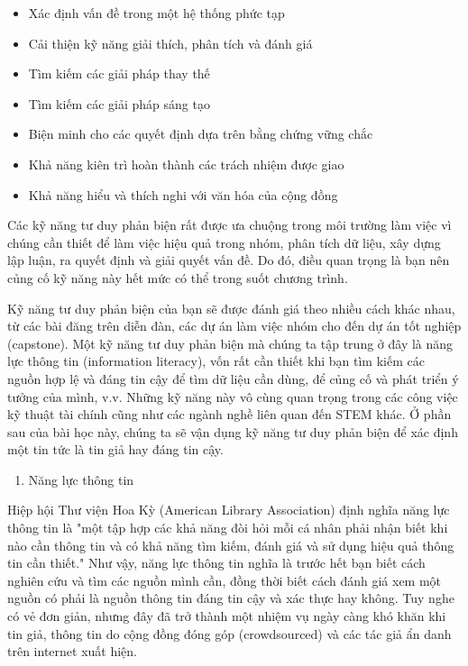 \begin{itemize}
\item
  Xác định vấn đề trong một hệ thống phức tạp
\item
  Cải thiện kỹ năng giải thích, phân tích và đánh giá
\item
  Tìm kiếm các giải pháp thay thế
\item
  Tìm kiếm các giải pháp sáng tạo
\item
  Biện minh cho các quyết định dựa trên bằng chứng vững chắc
\item
  Khả năng kiên trì hoàn thành các trách nhiệm được giao
\item
  Khả năng hiểu và thích nghi với văn hóa của cộng đồng
\end{itemize}

Các kỹ năng tư duy phản biện rất được ưa chuộng trong môi trường làm việc vì chúng cần thiết để làm việc hiệu quả trong nhóm, phân tích dữ liệu, xây dựng lập luận, ra quyết định và giải quyết vấn đề. Do đó, điều quan trọng là bạn nên củng cố kỹ năng này hết mức có thể trong suốt chương trình.

Kỹ năng tư duy phản biện của bạn sẽ được đánh giá theo nhiều cách khác nhau, từ các bài đăng trên diễn đàn, các dự án làm việc nhóm cho đến dự án tốt nghiệp (capstone). Một kỹ năng tư duy phản biện mà chúng ta tập trung ở đây là năng lực thông tin (information literacy), vốn rất cần thiết khi bạn tìm kiếm các nguồn hợp lệ và đáng tin cậy để tìm dữ liệu cần dùng, để củng cố và phát triển ý tưởng của mình, v.v. Những kỹ năng này vô cùng quan trọng trong các công việc kỹ thuật tài chính cũng như các ngành nghề liên quan đến STEM khác. Ở phần sau của bài học này, chúng ta sẽ vận dụng kỹ năng tư duy phản biện để xác định một tin tức là tin giả hay đáng tin cậy.

\begin{enumerate}
\def\labelenumi{\arabic{enumi}.}
\setcounter{enumi}{1}
\item
  Năng lực thông tin
\end{enumerate}

Hiệp hội Thư viện Hoa Kỳ (American Library Association) định nghĩa năng lực thông tin là "một tập hợp các khả năng đòi hỏi mỗi cá nhân phải nhận biết khi nào cần thông tin và có khả năng tìm kiếm, đánh giá và sử dụng hiệu quả thông tin cần thiết." Như vậy, năng lực thông tin nghĩa là trước hết bạn biết cách nghiên cứu và tìm các nguồn mình cần, đồng thời biết cách đánh giá xem một nguồn có phải là nguồn thông tin đáng tin cậy và xác thực hay không. Tuy nghe có vẻ đơn giản, nhưng đây đã trở thành một nhiệm vụ ngày càng khó khăn khi tin giả, thông tin do cộng đồng đóng góp (crowdsourced) và các tác giả ẩn danh trên internet xuất hiện.

